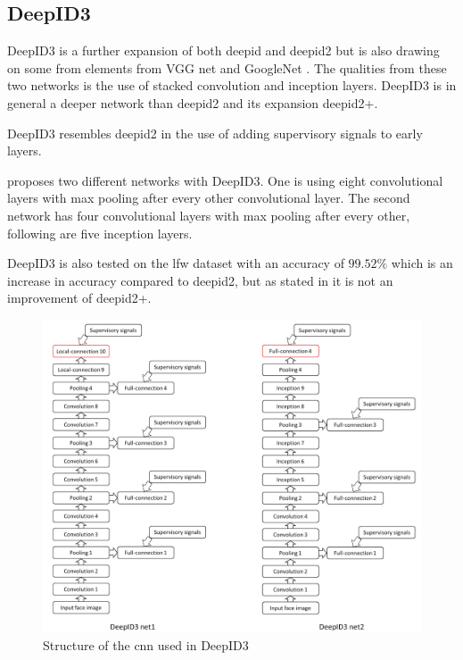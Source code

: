 \subsection{DeepID3}
DeepID3 is a further expansion of both \gls{deepid} and \gls{deepid2} but is also drawing on some from elements from VGG net and GoogleNet \citep{sun2015}. The qualities from these two networks is the use of stacked convolution and inception layers. DeepID3 is in general a deeper network than \gls{deepid2} and its expansion \gls{deepid2}+.

DeepID3 resembles \gls{deepid2} in the use of adding supervisory signals to early layers.

\cite{sun2015} proposes two different networks with DeepID3. One is using eight convolutional layers with max pooling after every other convolutional layer. The second network has four convolutional layers with max pooling after every other, following are five inception layers.

DeepID3 is also tested on the \gls{lfw} dataset with an accuracy of $99.52\%$ which is an increase in accuracy compared to \gls{deepid2}, but as stated in \cite{sun2015} it is not an improvement of \gls{deepid2}+.

\begin{figure}[h]
	\centering
	\includegraphics[width=\textwidth]{figures/deepid3_net}
	\caption{Structure of the \gls{cnn} used in DeepID3 \citep{sun2015}}
	\label{fig:deepid3_net}
\end{figure}